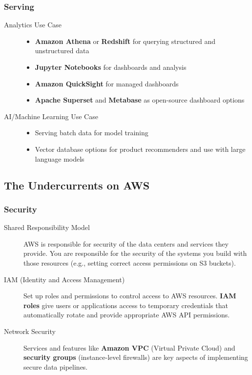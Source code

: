 \documentclass{article}
\begin{document}
\subsubsection{Serving}
\begin{description}
    \item[Analytics Use Case]
    \begin{itemize}
        \item \textbf{Amazon Athena} or \textbf{Redshift} for querying structured and unstructured data
        \item \textbf{Jupyter Notebooks} for dashboards and analysis
        \item \textbf{Amazon QuickSight} for managed dashboards
        \item \textbf{Apache Superset} and \textbf{Metabase} as open-source dashboard options
    \end{itemize}

    \item[AI/Machine Learning Use Case]
    \begin{itemize}
        \item Serving batch data for model training
        \item Vector database options for product recommenders and use with large language models
    \end{itemize}
\end{description}

\subsection{The Undercurrents on AWS}

\subsubsection{Security}
\begin{description}
    \item[Shared Responsibility Model] AWS is responsible for security of the data centers and services they provide. You are responsible for the security of the systems you build with those resources (e.g., setting correct access permissions on S3 buckets).

    \item[IAM (Identity and Access Management)] Set up roles and permissions to control access to AWS resources. \textbf{IAM roles} give users or applications access to temporary credentials that automatically rotate and provide appropriate AWS API permissions.

    \item[Network Security] Services and features like \textbf{Amazon VPC} (Virtual Private Cloud) and \textbf{security groups} (instance-level firewalls) are key aspects of implementing secure data pipelines.
\end{description}
\end{document}
